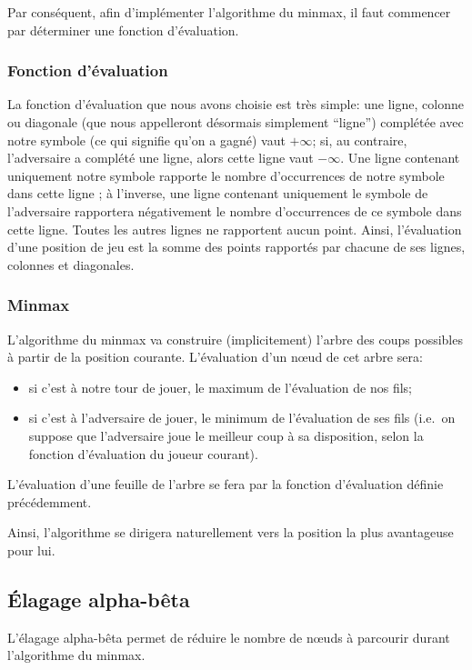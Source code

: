 Par conséquent, afin d'implémenter l'algorithme du minmax, il faut
commencer par déterminer une fonction d'évaluation.

\subsubsection{Fonction d'évaluation}
La fonction d'évaluation que nous avons choisie est très simple: une
ligne, colonne ou diagonale (que nous appelleront désormais simplement
``ligne'') complétée avec notre symbole (ce qui signifie qu'on a
gagné) vaut $+\infty$; si, au contraire, l'adversaire a complété une
ligne, alors cette ligne vaut $-\infty$. Une ligne contenant
uniquement notre symbole rapporte le nombre d'occurrences de notre
symbole dans cette ligne ; à l'inverse, une ligne contenant uniquement
le symbole de l'adversaire rapportera négativement le nombre
d'occurrences de ce symbole dans cette ligne.
Toutes les autres lignes ne rapportent aucun point.
Ainsi, l'évaluation d'une position de jeu est la somme des points
rapportés par chacune de ses lignes, colonnes et diagonales.

\subsubsection{Minmax}
L'algorithme du minmax va construire (implicitement) l'arbre des coups
possibles à partir de la position courante.
L'évaluation d'un nœud de cet arbre sera:
\begin{itemize}
  \item si c'est à notre tour de jouer, le maximum de l'évaluation de nos fils;
  \item si c'est à l'adversaire de jouer, le minimum de l'évaluation
    de ses fils (i.e.\ on suppose que l'adversaire joue le meilleur
    coup à sa disposition, selon la fonction d'évaluation du joueur courant).
\end{itemize}

L'évaluation d'une feuille de l'arbre se fera par la fonction
d'évaluation définie précédemment.

Ainsi, l'algorithme se dirigera naturellement vers la position la plus
avantageuse pour lui.

\subsection{Élagage alpha-bêta}
L'élagage alpha-bêta permet de réduire le nombre de nœuds à parcourir durant
l'algorithme du minmax.

